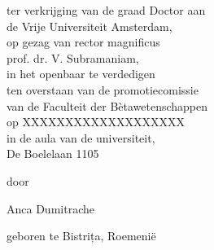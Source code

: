 \thispagestyle{empty}

\begin{addmargin}[1cm]{-1cm}
\begin{center}

  \vfill

  \large{}

  \vfill

  \Huge \myTitle

  \vfill

  \large{}

  \vfill
  
  ter verkrijging van de graad Doctor aan\\
  de Vrije Universiteit Amsterdam,\\
  op gezag van rector magnificus\\
  prof. dr. V. Subramaniam,\\
  in het openbaar te verdedigen\\
  ten overstaan van de promotiecomissie\\
  van de Faculteit der Bètawetenschappen\\
  op XXXXXXXXXXXXXXXXXXX\\
  in de aula van de universiteit,\\
  De Boelelaan 1105\\\bigskip
  
  door\\\bigskip

  Anca Dumitrache\\\bigskip

  geboren te Bistrița, Roemenië

  \vfill

\end{center}
\end{addmargin}